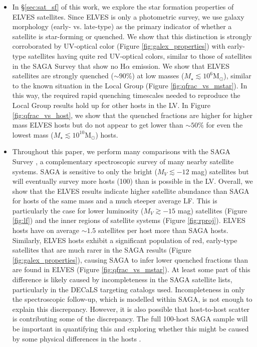 \documentclass[twocolumn]{aastex62}
\newcommand{\msun}{M$_\odot$}
\begin{document}
\begin{itemize}
    \item In \S\ref{sec:sat_sf} of this work, we explore the star formation properties of ELVES satellites. Since ELVES is only a photometric survey, we use galaxy morphology (early- vs. late-type) as the primary indicator of whether a satellite is star-forming or quenched. We show that this distinction is strongly corroborated by UV-optical color (Figure \ref{fig:galex_properties}) with early-type satellites having quite red UV-optical colors, similar to those of satellites in the SAGA Survey \citep{mao2020} that show no H$\alpha$ emission. We show that ELVES satellites are strongly quenched ($\sim90$\%) at low masses ($M_\star\lesssim10^6$\msun), similar to the known situation in the Local Group (Figure \ref{fig:qfrac_vs_mstar}). In this way, the required rapid quenching timescales needed to reproduce the Local Group results hold up for other hosts in the LV. In Figure \ref{fig:qfrac_vs_host}, we show that the quenched fractions are higher for higher mass ELVES hosts but do not appear to get lower than $\sim50\%$ for even the lowest mass ($M_\star\lesssim10^{10}$\msun) hosts. 
    
    
    \item Throughout this paper, we perform many comparisons with the SAGA Survey \citep{geha2017, mao2020}, a complementary spectroscopic survey of many nearby satellite systems. SAGA is sensitive to only the bright ($M_V\lesssim-12$ mag) satellites but will eventually survey more hosts (100) than is possible in the LV. Overall, we show that the ELVES results indicate higher satellite abundance than SAGA for hosts of the same mass and a much steeper average LF. This is particularly the case for lower luminosity ($M_V\gtrsim-15$ mag) satellites (Figure \ref{fig:lf}) and the inner regions of satellite systems (Figure \ref{fig:rproj}). ELVES hosts have on average $\sim1.5$ satellites per host more than SAGA hosts. Similarly, ELVES hosts exhibit a significant population of red, early-type satellites that are much rarer in the SAGA results (Figure \ref{fig:galex_properties}), causing SAGA to infer lower quenched fractions than are found in ELVES (Figure \ref{fig:qfrac_vs_mstar}). At least some part of this difference is likely caused by incompleteness in the SAGA satellite lists, particularly in the DECaLS targeting catalogs used. Incompleteness in only the spectroscopic follow-up, which is modelled within SAGA, is not enough to explain this discrepancy. However, it is also possible that host-to-host scatter is contributing some of the discrepancy. The full 100-host SAGA sample will be important in quantifying this and exploring whether this  might be caused by some physical differences in the hosts \citep[e.g. different large scale environments, ][]{neuzil2020}. 
    
\end{itemize}
\end{document}
